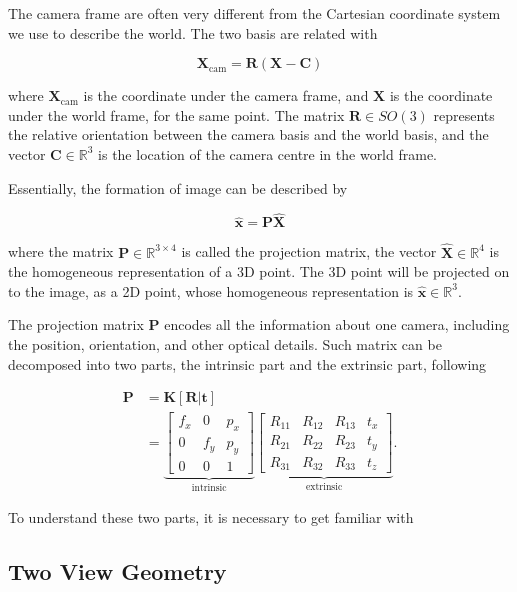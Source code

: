 \documentclass[11pt,twoside]{report}
\begin{document}
The camera frame are often very different from the Cartesian coordinate system we use to describe the world. The two basis are related with

$$
\mathbf{X}_\text{cam} = \mathbf{R}(\mathbf{X} - \mathbf{C})
$$

\noindent where $\mathbf{X}_\text{cam}$ is the coordinate under the camera frame, and $\mathbf{X}$ is the coordinate under the world frame, for the same point. The matrix $\mathbf{R} \in SO(3)$ represents the relative orientation between the camera basis and the world basis, and the vector $\mathbf{C} \in \mathbb{R}^3$ is the location of the camera centre in the world frame.

Essentially, the formation of image can be described by 

$$
\hat{\mathbf{x}} = \mathbf{P} \hat{\mathbf{X}}
$$

\noindent where the matrix $\mathbf{P} \in \mathbb{R}^{3 \times 4}$ is called the projection matrix, the vector $\hat{\mathbf{X}} \in \mathbb{R}^4$ is the homogeneous representation of a 3D point. The 3D point will be projected on to the image, as a 2D point, whose homogeneous representation is $\hat{\mathbf{x}} \in \mathbb{R}^3$.

The projection matrix $\mathbf{P}$ encodes all the information about one camera, including the position, orientation, and other optical details. Such matrix can be decomposed into two parts, the intrinsic part and the extrinsic part, following

$$
\begin{aligned}
\mathbf{P}
&= \mathbf{K} [\mathbf{R}|\mathbf{t}] \\
&=
\underbrace{
	\begin{bmatrix}
		f_x & 0 & p_x \\
		0 & f_y & p_y \\
		0 & 0 & 1
	\end{bmatrix}
}_{\text{intrinsic}}
\underbrace{
	\left[
	\begin{array}{ccc|c}
		R_{11} & R_{12} & R_{13} & t_x\\
		R_{21} & R_{22} & R_{23} & t_y\\
		R_{31} & R_{32} & R_{33} & t_z
	\end{array}
	\right]
}_{\text{extrinsic}}.
\end{aligned}
$$

\noindent To understand these two parts, it is necessary to get familiar with 


\subsection{Two View Geometry}
\end{document}
